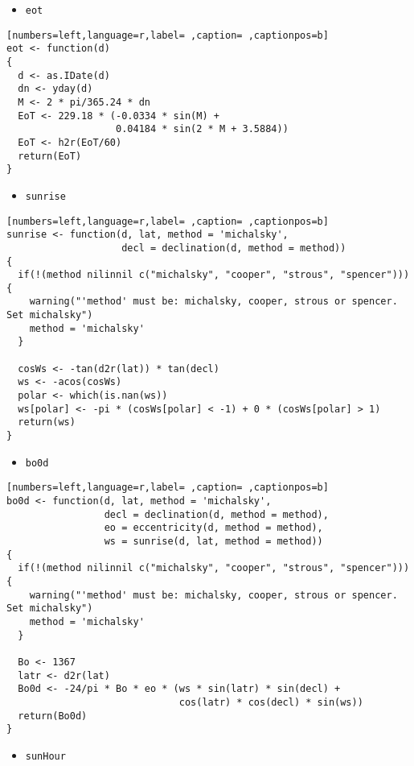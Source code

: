 \begin{itemize}
\item \texttt{eot}
\end{itemize}
\begin{lstlisting}[numbers=left,language=r,label= ,caption= ,captionpos=b]
eot <- function(d)
{
  d <- as.IDate(d)
  dn <- yday(d)
  M <- 2 * pi/365.24 * dn
  EoT <- 229.18 * (-0.0334 * sin(M) +
                   0.04184 * sin(2 * M + 3.5884))
  EoT <- h2r(EoT/60)
  return(EoT)
}
\end{lstlisting}
\begin{itemize}
\item \texttt{sunrise}
\end{itemize}
\begin{lstlisting}[numbers=left,language=r,label= ,caption= ,captionpos=b]
sunrise <- function(d, lat, method = 'michalsky',
                    decl = declination(d, method = method))
{
  if(!(method nilinnil c("michalsky", "cooper", "strous", "spencer"))){
    warning("'method' must be: michalsky, cooper, strous or spencer.
Set michalsky")
    method = 'michalsky'
  }

  cosWs <- -tan(d2r(lat)) * tan(decl)
  ws <- -acos(cosWs)
  polar <- which(is.nan(ws))
  ws[polar] <- -pi * (cosWs[polar] < -1) + 0 * (cosWs[polar] > 1)
  return(ws)
}
\end{lstlisting}
\begin{itemize}
\item \texttt{bo0d}
\end{itemize}
\begin{lstlisting}[numbers=left,language=r,label= ,caption= ,captionpos=b]
bo0d <- function(d, lat, method = 'michalsky',
                 decl = declination(d, method = method),
                 eo = eccentricity(d, method = method),
                 ws = sunrise(d, lat, method = method))
{
  if(!(method nilinnil c("michalsky", "cooper", "strous", "spencer"))){
    warning("'method' must be: michalsky, cooper, strous or spencer.
Set michalsky")
    method = 'michalsky'
  }

  Bo <- 1367
  latr <- d2r(lat)
  Bo0d <- -24/pi * Bo * eo * (ws * sin(latr) * sin(decl) +
                              cos(latr) * cos(decl) * sin(ws))
  return(Bo0d)
}
\end{lstlisting}
\begin{itemize}
\item \texttt{sunHour}
\end{itemize}
